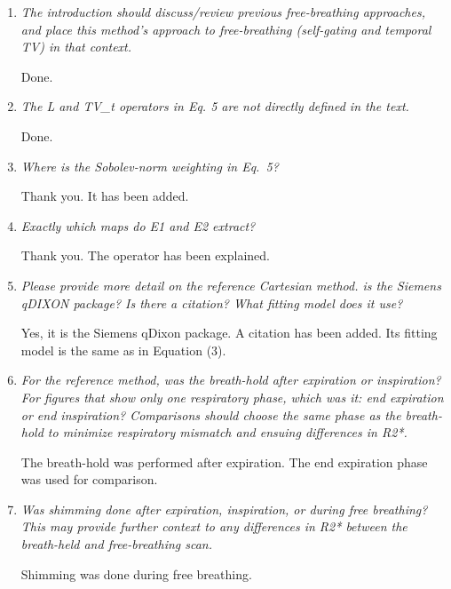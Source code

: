 \documentclass[a4paper,11pt]{report}
\begin{document}
\begin{enumerate}[resume]
	\item \textit{The introduction should discuss/review previous free-breathing approaches, and place this method's approach to free-breathing (self-gating and temporal TV) in that context.}

\hspace{1em} Done.

	\item \textit{The L and TV\_t operators in Eq. 5 are not directly defined in the text.}

\hspace{1em} Done.

	\item \textit{Where is the Sobolev-norm weighting in Eq.~5?}

\hspace{1em} Thank you. It has been added.

	\item \textit{Exactly which maps do E1 and E2 extract?}

\hspace{1em} Thank you. The operator has been explained.

	\item \textit{Please provide more detail on the reference Cartesian method. is the Siemens qDIXON package? Is there a citation? What fitting model does it use?}

\hspace{1em} Yes, it is the Siemens qDixon package. A citation has been added. 
Its fitting model is the same as in Equation (3).

	\item \textit{For the reference method, was the breath-hold after expiration or inspiration? For figures that show only one respiratory phase, which was it: end expiration or end inspiration? Comparisons should choose the same phase as the breath-hold to minimize respiratory mismatch and ensuing differences in R2*.}

\hspace{1em} The breath-hold was performed after expiration. 
The end expiration phase was used for comparison.

	\item \textit{Was shimming done after expiration, inspiration, or during free breathing? This may provide further context to any differences in R2* between the breath-held and free-breathing scan.}

\hspace{1em} Shimming was done during free breathing.


\end{enumerate}
\end{document}
